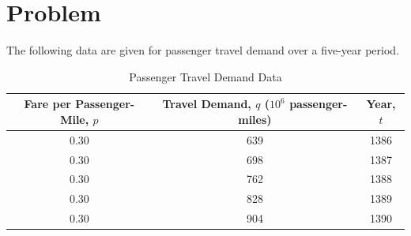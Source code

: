 \documentclass{KPS_assignment}
\begin{document}
\maketitle
\section{Problem}

The following data are given for passenger travel demand over a five-year period.

\begin{table}[!h]
\centering
\caption{Passenger Travel Demand Data}
\begin{tabular}{|c|c|c|}
\hline
\textbf{Fare per Passenger-Mile, $p$} &
\textbf{Travel Demand, $q$ ($10^6$ passenger-miles)} &
\textbf{Year, $t$} \\ \hline

0.30 & 639 & 1386 \\ \hline
0.30 & 698 & 1387 \\ \hline
0.30 & 762 & 1388 \\ \hline
0.30 & 828 & 1389 \\ \hline
0.30 & 904 & 1390 \\ \hline

\end{tabular}
\end{table}
\end{document}
